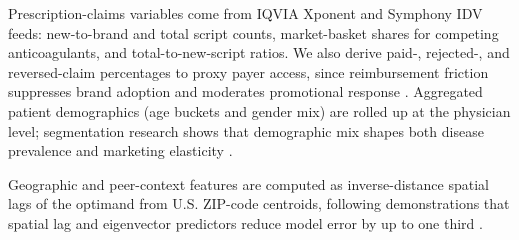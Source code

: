 Prescription-claims variables come from IQVIA Xponent and Symphony IDV feeds: new-to-brand and total script counts, market-basket shares for competing anticoagulants, and total-to-new-script ratios. We also derive paid-, rejected-, and reversed-claim percentages to proxy payer access, since reimbursement friction suppresses brand adoption and moderates promotional response \citep{Chiplunkar2020}. Aggregated patient demographics (age buckets and gender mix) are rolled up at the physician level; segmentation research shows that demographic mix shapes both disease prevalence and marketing elasticity \citep{Awadhwal2023}.

Geographic and peer-context features are computed as inverse-distance spatial lags of the optimand from U.S. ZIP-code centroids, following demonstrations that spatial lag and eigenvector predictors reduce model error by up to one third \citep{Liuetal2022}.

